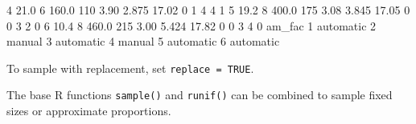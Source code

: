 \documentclass[
]{book}
\newenvironment{Shaded}{\begin{snugshade}}{\end{snugshade}}
\newcommand{\DecValTok}[1]{\textcolor[rgb]{0.00,0.00,0.81}{#1}}
\newcommand{\FloatTok}[1]{\textcolor[rgb]{0.00,0.00,0.81}{#1}}
\newcommand{\NormalTok}[1]{#1}
\begin{document}
\begin{Shaded}
\begin{Highlighting}[]
\DecValTok{4} \FloatTok{21.0}         \DecValTok{6} \FloatTok{160.0} \DecValTok{110}       \FloatTok{3.90}  \FloatTok{2.875} \FloatTok{17.02}      \DecValTok{0}  \DecValTok{1}    \DecValTok{4}    \DecValTok{4}     \DecValTok{1}
\DecValTok{5} \FloatTok{19.2}         \DecValTok{8} \FloatTok{400.0} \DecValTok{175}       \FloatTok{3.08}  \FloatTok{3.845} \FloatTok{17.05}      \DecValTok{0}  \DecValTok{0}    \DecValTok{3}    \DecValTok{2}     \DecValTok{0}
\DecValTok{6} \FloatTok{10.4}         \DecValTok{8} \FloatTok{460.0} \DecValTok{215}       \FloatTok{3.00}  \FloatTok{5.424} \FloatTok{17.82}      \DecValTok{0}  \DecValTok{0}    \DecValTok{3}    \DecValTok{4}     \DecValTok{0}
\NormalTok{     am\_fac}
\DecValTok{1}\NormalTok{ automatic}
\DecValTok{2}\NormalTok{    manual}
\DecValTok{3}\NormalTok{ automatic}
\DecValTok{4}\NormalTok{    manual}
\DecValTok{5}\NormalTok{ automatic}
\DecValTok{6}\NormalTok{ automatic}
\end{Highlighting}
\end{Shaded}

To sample with replacement, set \texttt{replace\ =\ TRUE}.

The base R functions \texttt{sample()} and \texttt{runif()} can be combined to sample fixed sizes or approximate proportions.
\end{document}
